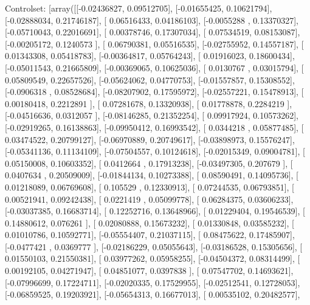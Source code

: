 \documentclass{article}
\begin{document}
Controlset: [array([[-0.02436827,  0.09512705],
       [-0.01655425,  0.10621794],
       [-0.02888034,  0.21746187],
       [ 0.06516433,  0.04186103],
       [-0.0055288 ,  0.13370327],
       [-0.05710043,  0.22016691],
       [ 0.00378746,  0.17307034],
       [ 0.07534519,  0.08153087],
       [-0.00205172,  0.1240573 ],
       [ 0.06790381,  0.05516535],
       [-0.02755952,  0.14557187],
       [ 0.01343308,  0.05418783],
       [-0.00364817,  0.05764243],
       [ 0.01916023,  0.18600434],
       [-0.05011543,  0.21665809],
       [-0.00369065,  0.10625036],
       [ 0.0130767 ,  0.03015794],
       [ 0.05809549,  0.22657526],
       [-0.05624062,  0.04770753],
       [-0.01557857,  0.15308552],
       [-0.0906318 ,  0.08528684],
       [-0.08207902,  0.17595972],
       [-0.02557221,  0.15478913],
       [ 0.00180418,  0.2212891 ],
       [ 0.07281678,  0.13320938],
       [ 0.01778878,  0.2284219 ],
       [-0.04516636,  0.0312057 ],
       [-0.08146285,  0.21352254],
       [ 0.09917924,  0.10573262],
       [-0.02919265,  0.16138863],
       [-0.09950412,  0.16993542],
       [ 0.0344218 ,  0.05877485],
       [ 0.03474522,  0.20799127],
       [-0.06970889,  0.20749617],
       [-0.03898973,  0.15576247],
       [-0.05341136,  0.11134109],
       [-0.07504557,  0.10124618],
       [-0.02015349,  0.09004781],
       [ 0.05150008,  0.10603352],
       [ 0.0412664 ,  0.17913238],
       [-0.03497305,  0.207679  ],
       [ 0.0407634 ,  0.20509009],
       [-0.01844134,  0.10273388],
       [ 0.08590491,  0.14095736],
       [ 0.01218089,  0.06769608],
       [ 0.105529  ,  0.12330913],
       [ 0.07244535,  0.06793851],
       [ 0.00521941,  0.09242438],
       [ 0.0221419 ,  0.05099778],
       [ 0.06284375,  0.03606233],
       [-0.03037385,  0.16683714],
       [ 0.12252716,  0.13648966],
       [ 0.01229404,  0.19546539],
       [ 0.14880612,  0.076261  ],
       [ 0.02080888,  0.15673232],
       [ 0.01330848,  0.03585232],
       [ 0.01010786,  0.10592771],
       [-0.05554407,  0.21037115],
       [ 0.08475622,  0.17485907],
       [-0.0477421 ,  0.0369777 ],
       [-0.02186229,  0.05055643],
       [-0.03186528,  0.15305656],
       [ 0.01550103,  0.21550381],
       [ 0.03977262,  0.05958255],
       [-0.04504372,  0.08314499],
       [ 0.00192105,  0.04271947],
       [ 0.04851077,  0.0397838 ],
       [ 0.07547702,  0.14693621],
       [-0.07996699,  0.17224711],
       [-0.02020335,  0.17529955],
       [-0.02512541,  0.12728053],
       [-0.06859525,  0.19203921],
       [-0.05654313,  0.16677013],
       [ 0.00535102,  0.20482577],
\end{document}

